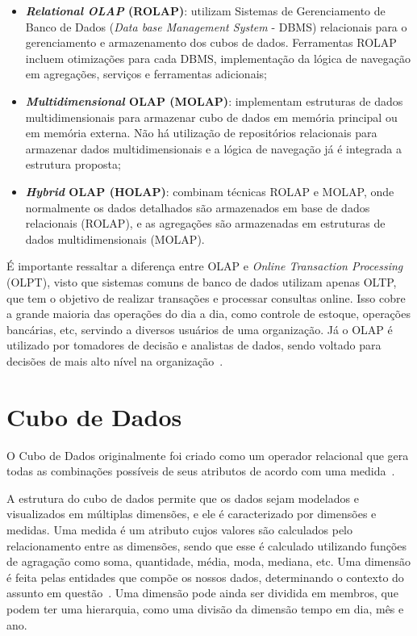 \begin{itemize}
	\item \textbf{\textit{Relational OLAP} (ROLAP)}: utilizam Sistemas de Gerenciamento de Banco de Dados (\textit{Data base Management System} - DBMS) relacionais para o gerenciamento e armazenamento dos cubos de dados.
Ferramentas ROLAP incluem otimizações para cada DBMS, implementação da lógica de navegação em agregações, serviços e ferramentas adicionais;
	\item \textbf{\textit{Multidimensional} OLAP (MOLAP)}: implementam estruturas de dados multidimensionais para armazenar cubo de dados em memória principal ou em memória externa.
Não há utilização de repositórios relacionais para armazenar dados multidimensionais e a lógica de navegação já é integrada a estrutura proposta;
	\item \textbf{\textit{Hybrid} OLAP (HOLAP)}: combinam técnicas ROLAP e MOLAP, onde normalmente os dados detalhados são armazenados em base de dados relacionais (ROLAP), e as agregações são armazenadas em estruturas de dados multidimensionais (MOLAP).
\end{itemize}

É importante ressaltar a diferença entre OLAP e \textit{Online Transaction Processing} (OLPT), visto que sistemas comuns de banco de dados utilizam apenas OLTP, que tem o objetivo de realizar transações e processar consultas online.
Isso cobre a grande maioria das operações do dia a dia, como controle de estoque, operações bancárias, etc, servindo a diversos usuários de uma organização.
Já o OLAP é utilizado por tomadores de decisão e analistas de dados, sendo voltado para decisões de mais alto nível na organização~\cite{hanDataMiningConcepts2011}.

\section{Cubo de Dados}\label{ch:fun:cube}

O Cubo de Dados originalmente foi criado como um operador relacional que gera todas as combinações possíveis de seus atributos de acordo com uma medida~\cite{grayDataCubeRelational1996}.

A estrutura do cubo de dados permite que os dados sejam modelados e visualizados em múltiplas dimensões, e ele é caracterizado por dimensões e medidas.
Uma medida é um atributo cujos valores são calculados pelo relacionamento entre as dimensões, sendo que esse é calculado utilizando funções de agragação como soma, quantidade, média, moda, mediana, etc.
Uma dimensão é feita pelas entidades que compõe os nossos dados, determinando o contexto do assunto em questão~\cite{hanDataMiningConcepts2011}.
Uma dimensão pode ainda ser dividida em membros, que podem ter uma hierarquia, como uma divisão da dimensão tempo em dia, mês e ano.

